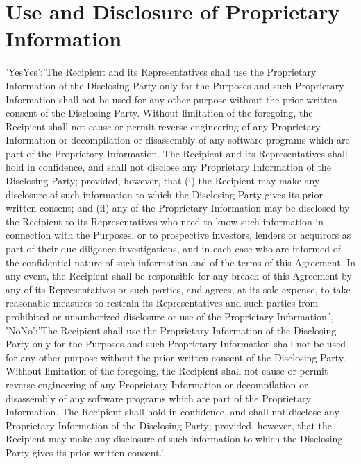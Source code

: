 \documentclass[12pt]{article}
\newcommand{\VAR}[1]{{\color{blue}#1}}
\begin{document}
\section{Use and Disclosure of Proprietary Information}\label{sec:discl}
\VAR{
    {
        'YesYes':'The Recipient and its Representatives shall use the Proprietary Information of the Disclosing Party only for the Purposes and such Proprietary Information shall not be used for any other purpose without the prior written consent of the Disclosing Party. Without limitation of the foregoing, the Recipient shall not cause or permit reverse engineering of any Proprietary Information or decompilation or disassembly of any software programs which are part of the Proprietary Information. The Recipient and its Representatives shall hold in confidence, and shall not disclose any Proprietary Information of the Disclosing Party; provided, however, that (i) the Recipient may make any disclosure of such information to which the Disclosing Party gives its prior written consent; and (ii) any of the Proprietary Information may be disclosed by the Recipient to its Representatives who need to know such information in connection with the Purposes, or to prospective investors, lenders or acquirors as part of their due diligence investigations, and in each case who are informed of the confidential nature of such information and of the terms of this Agreement. In any event, the Recipient shall be responsible for any breach of this Agreement by any of its Representatives or such parties, and agrees, at its sole expense, to take reasonable measures to restrain its Representatives and such parties from prohibited or unauthorized disclosure or use of the Proprietary Information.',
        'NoNo':'The Recipient shall use the Proprietary Information of the Disclosing Party only for the Purposes and such Proprietary Information shall not be used for any other purpose without the prior written consent of the Disclosing Party. Without limitation of the foregoing, the Recipient shall not cause or permit reverse engineering of any Proprietary Information or decompilation or disassembly of any software programs which are part of the Proprietary Information. The Recipient shall hold in confidence, and shall not disclose any Proprietary Information of the Disclosing Party; provided, however, that the Recipient may make any disclosure of such information to which the Disclosing Party gives its prior written consent.',
}}
\end{document}
